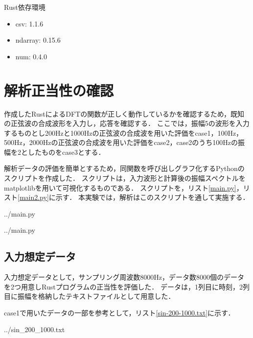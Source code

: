 \documentclass[dvipdfmx,titlepage,a4j]{jsarticle}  %
\begin{document}
Rust依存環境
\begin{itemize}
  \item csv: 1.1.6
  \item ndarray: 0.15.6
  \item num: 0.4.0
\end{itemize}

\section{解析正当性の確認}
作成したRustによるDFTの関数が正しく動作しているかを確認するため，既知の正弦波の合成波形を入力し，応答を確認する．
ここでは，振幅5の波形を入力するものとし200Hzと1000Hzの正弦波の合成波を用いた評価をcase1，100Hz，500Hz，2000Hzの正弦波の合成波を用いた評価をcase2，case2のうち100Hzの振幅を2としたものをcase3とする．

解析データの評価を簡単とするため，同関数を呼び出しグラフ化するPythonのスクリプトを作成した．
スクリプトは，入力波形と計算後の振幅スペクトルをmatplotlibを用いて可視化するものである．
スクリプトを，リスト\ref{main.py}，リスト\ref{main2.py}に示す．
本実験では，解析はこのスクリプトを通して実施する．


{../main.py}

{../main.py}

\subsection{入力想定データ}
入力想定データとして，サンプリング周波数$8000$Hz，データ数$8000$個のデータを2つ用意しRustプログラムの正当性を評価した．
データは，1列目に時刻，2列目に振幅を格納したテキストファイルとして用意した．

case1で用いたデータの一部を参考として，リスト\ref{sin-200-1000.txt}に示す．

{../sin_200_1000.txt}
\end{document}
